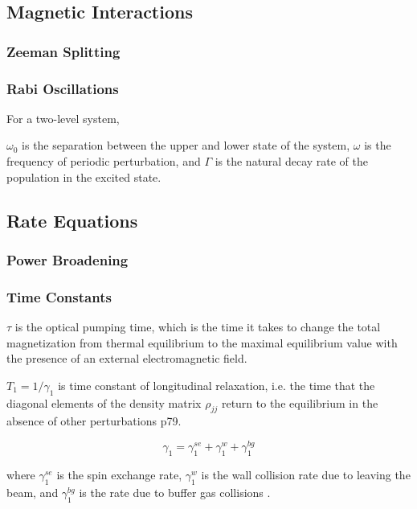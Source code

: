 \subsection{Magnetic Interactions}

\subsubsection{Zeeman Splitting}



\subsubsection{Rabi Oscillations}

For a two-level system, 

$\omega_0$ is the separation between the upper and lower state of the system, $\omega$ is the frequency of periodic perturbation, and $\Gamma$ is the natural decay rate of the population in the excited state.

\subsection{Rate Equations}

\subsubsection{Power Broadening}

\subsubsection{Time Constants}

$\tau$ is the optical pumping time, which is the time it takes to
change the total magnetization from thermal equilibrium to the maximal
equilibrium value with the presence of an external electromagnetic
field.

$T_1 = 1/\gamma_1$ is time constant of longitudinal relaxation,
i.e. the time that the diagonal elements of the density matrix $\rho_{jj}$
return to the equilibrium in the absence of other perturbations
\cite{vanier} p79.

\begin{equation}
\gamma_1 = \gamma_1^{se} + \gamma_1^{w} + \gamma_1^{bg} 
\label{eqn:gamma1}
\end{equation}

where $\gamma_1^{se}$ is the spin exchange rate, $\gamma_1^{w}$ is the
wall collision rate due to leaving the beam, and $\gamma_1^{bg}$ is
the rate due to buffer gas collisions \cite{vanier}.

